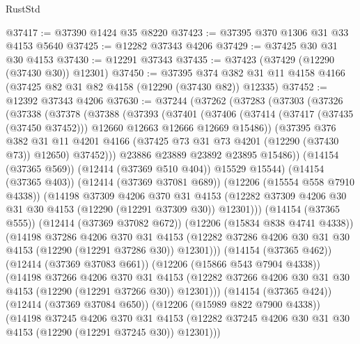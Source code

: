 \begin{lexlean}{RustStd}
\begin{coremodule}
@37417 := @37390 @1424 @35 @8220
@37423 := @37395 @370 @1306 @31 @33 @4153 @5640
@37425 := @12282 @37343 @4206
@37429 := @37425 @30 @31 @30 @4153
@37430 := @12291 @37343
@37435 := @37423 (@37429 (@12290 (@37430 @30)) @12301)
@37450 := @37395
    @374
    @382
    @31
    @11
    @4158
    @4166
    (@37425 @82 @31 @82 @4158 (@12290 (@37430 @82)) @12335)
@37452 := @12392 @37343 @4206
@37630 := @37244
    (@37262
      (@37283
        (@37303
          (@37326
            (@37338
              (@37378
                (@37388
                  (@37393
                    (@37401
                      (@37406
                        (@37414
                          (@37417 (@37435 (@37450 @37452)))
                          @12660
                          @12663
                          @12666
                          @12669
                          @15486))
                      (@37395
                        @376
                        @382
                        @31
                        @11
                        @4201
                        @4166
                        (@37425 @73 @31 @73 @4201 (@12290 (@37430 @73)) @12650)
                        @37452)))
                  @23886
                  @23889
                  @23892
                  @23895
                  @15486))
              (@14154 (@37365 @569))
              (@12414 (@37369 @510 @404))
              @15529
              @15544)
            (@14154 (@37365 @403))
            (@12414 (@37369 @37081 @689))
            (@12206 (@15554 @558 @7910 @4338))
            (@14198
              @37309
              @4206
              @370
              @31
              @4153
              (@12282 @37309 @4206 @30 @31 @30 @4153 (@12290 (@12291 @37309 @30)) @12301)))
          (@14154 (@37365 @555))
          (@12414 (@37369 @37082 @672))
          (@12206 (@15834 @838 @4741 @4338))
          (@14198
            @37286
            @4206
            @370
            @31
            @4153
            (@12282 @37286 @4206 @30 @31 @30 @4153 (@12290 (@12291 @37286 @30)) @12301)))
        (@14154 (@37365 @462))
        (@12414 (@37369 @37083 @661))
        (@12206 (@15866 @543 @7904 @4338))
        (@14198
          @37266
          @4206
          @370
          @31
          @4153
          (@12282 @37266 @4206 @30 @31 @30 @4153 (@12290 (@12291 @37266 @30)) @12301)))
      (@14154 (@37365 @424))
      (@12414 (@37369 @37084 @650))
      (@12206 (@15989 @822 @7900 @4338))
      (@14198
        @37245
        @4206
        @370
        @31
        @4153
        (@12282 @37245 @4206 @30 @31 @30 @4153 (@12290 (@12291 @37245 @30)) @12301)))

\end{coremodule}
\end{lexlean}
